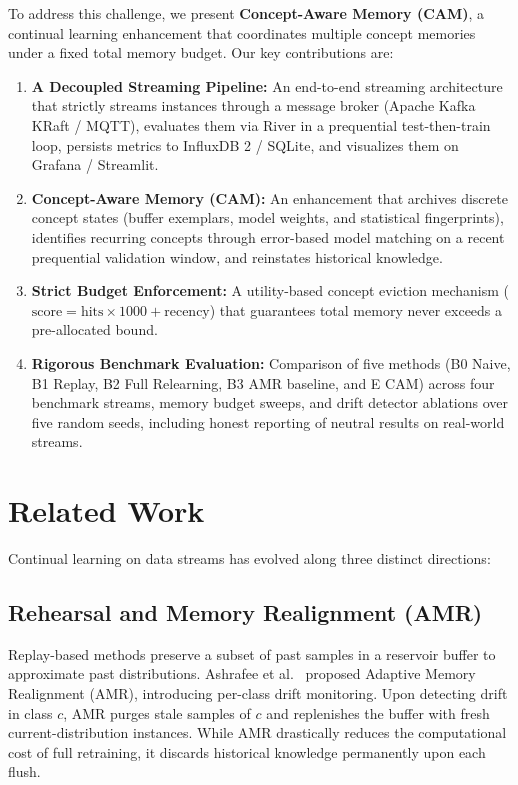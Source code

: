 \documentclass[conference]{IEEEtran}
\begin{document}
To address this challenge, we present \textbf{Concept-Aware Memory (CAM)}, a continual learning enhancement that coordinates multiple concept memories under a fixed total memory budget. Our key contributions are:
\begin{enumerate}
    \item \textbf{A Decoupled Streaming Pipeline:} An end-to-end streaming architecture that strictly streams instances through a message broker (Apache Kafka KRaft / MQTT), evaluates them via River in a prequential test-then-train loop, persists metrics to InfluxDB 2 / SQLite, and visualizes them on Grafana / Streamlit.
    \item \textbf{Concept-Aware Memory (CAM):} An enhancement that archives discrete concept states (buffer exemplars, model weights, and statistical fingerprints), identifies recurring concepts through error-based model matching on a recent prequential validation window, and reinstates historical knowledge.
    \item \textbf{Strict Budget Enforcement:} A utility-based concept eviction mechanism ($\text{score} = \text{hits} \times 1000 + \text{recency}$) that guarantees total memory never exceeds a pre-allocated bound.
    \item \textbf{Rigorous Benchmark Evaluation:} Comparison of five methods (B0 Naive, B1 Replay, B2 Full Relearning, B3 AMR baseline, and E CAM) across four benchmark streams, memory budget sweeps, and drift detector ablations over five random seeds, including honest reporting of neutral results on real-world streams.
\end{enumerate}

\section{Related Work}
Continual learning on data streams has evolved along three distinct directions:

\subsection{Rehearsal and Memory Realignment (AMR)}
Replay-based methods preserve a subset of past samples in a reservoir buffer to approximate past distributions. Ashrafee et al.~\cite{ashrafee2025amr} proposed Adaptive Memory Realignment (AMR), introducing per-class drift monitoring. Upon detecting drift in class $c$, AMR purges stale samples of $c$ and replenishes the buffer with fresh current-distribution instances. While AMR drastically reduces the computational cost of full retraining, it discards historical knowledge permanently upon each flush.
\end{document}
